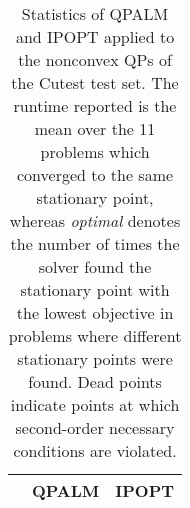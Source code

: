 \documentclass{amsart}
\begin{document}
\begin{table}[ht]
\centering
\begin{tabular}{l|cc}
 & QPALM & IPOPT \\ \hline

\end{tabular}
\caption{Statistics of QPALM and IPOPT applied to the nonconvex QPs of the Cutest test set. The runtime reported is the mean over the 11 problems which converged to the same stationary point, whereas \textit{optimal} denotes the number of times the solver found the stationary point with the lowest objective in problems where different stationary points were found. Dead points indicate points at which second-order necessary conditions are violated.}
\end{table}
\end{document}
